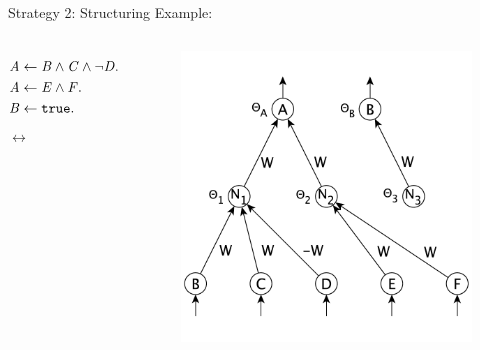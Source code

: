\documentclass[presentation]{beamer}\mode<presentation>{\usetheme{AMSBolognaFC}}
\begin{document}
\begin{frame}[allowframebreaks]{Strategy 2: Structuring}
    Example:
    \begin{columns}
        \begin{equation*}
            \begin{aligned}
                \mathit{A}&\leftarrow\mathit{B}\wedge\mathit{C}\wedge\neg\mathit{D}.\\
                \mathit{A}&\leftarrow\mathit{E}\wedge\mathit{F}.\\
                \mathit{B}&\leftarrow\mathtt{true}.\\
            \end{aligned}    
        \end{equation*}
        \centering $\leftrightarrow$
        \begin{figure}
            \centering
            \includegraphics[width=\linewidth]{figures/structuring-example}
        \end{figure}
    \end{columns}
\end{frame}
\end{document}
